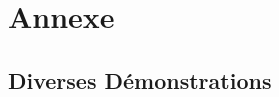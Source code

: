 \documentclass[a4paper,11pt,twoside,openright]{report}
\renewcommand{\(}{\ensuremath{\left(}}
\renewcommand{\)}{\ensuremath{\right)}}
\begin{document}
	
	

	\appendix
	\part{Annexe}

		\chapter{Diverses Démonstrations}
			\minitoc
			

\end{document}
